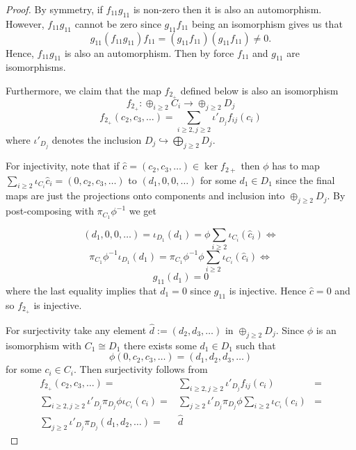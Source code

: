\begin{proof}
 By symmetry, if $f_{11}g_{11}$ is non-zero then it is also an automorphism. However, $f_{11}g_{11}$ cannot be zero since $g_{11}f_{11}$ being an isomorphism gives us that
 \[ g_{11}(f_{11}g_{11})f_{11} = (g_{11}f_{11})(g_{11}f_{11}) \neq 0.\]
 Hence, $f_{11}g_{11}$ is also an automorphism. Then by force $f_{11}$ and $g_{11}$ are isomorphisms.


  Furthermore, we claim that the map $f_{2_{+}}$ defined below is also an isomorphism
  \[ f_{2_{+}}: \oplus_{i \geq 2}C_{i} \to \oplus_{j \geq 2} D_{j} \]
  \[f_{2_{+}}(c_{2},c_{3},\dots) = \sum_{i \geq 2,j \geq 2} \iota'_{D_{j}}f_{ij}(c_{i}) \] where $\iota'_{D_{j}}$ denotes the inclusion $D_{j} \hookrightarrow \bigoplus_{j \geq 2} D_{j}$.

  For injectivity, note that if $\hat c = (c_{2},c_{3},\dots) \in \ker f_{2+}$ then $\phi$ has to map $\sum_{i \geq 2} \iota_{C_{i}} \hat c_{i}=(0,c_{2},c_{3},\dots)$ to $(d_{1},0,0,\dots)$ for some $d_{1} \in D_{1}$ since the final maps are just the projections onto components and inclusion into $\oplus_{j \geq 2}D_{j}$. By post-composing with $\pi_{C_{1}} \phi^{-1}$ we get

  \[(d_{1},0,0,\dots) = \iota_{D_{1}}(d_{1})= \phi \sum_{i \geq 2}\iota_{C_{i}}(\hat c_{i}) \iff
  \]
  \[
    \pi_{C_{1}} \phi^{-1} \iota_{D_{1}}(d_{1})=  \pi_{C_{1}} \phi^{-1} \phi \sum_{i \geq 2}\iota_{C_{i}}(\hat c_{i}) \iff \]
    \[  g_{11}(d_{1}) = 0
    \]
    where the last equality implies that $d_{1}=0$ since $g_{11}$ is injective. Hence $\hat c = 0$ and so $f_{2_{+}}$ is injective.

    For surjectivity take any element $\hat d := (d_{2},d_{3},\dots)$ in $\oplus_{j \geq 2}D_{j}$. Since $\phi$ is an isomorphism with $C_{1} \cong D_{1}$ there exists some $d_{1} \in D_{1}$ such that
    \[\phi (0,c_{2},c_{3},\dots) = (d_{1},d_{2},d_{3},\dots)\] for some $ c_{i} \in C_{i}$. Then surjectivity follows from
    \begin{align*}
       f_{2_{+}}(c_{2},c_{3}, \dots) = & \sum_{i \geq 2,j \geq 2} \iota'_{D_{j}}f_{ij}(c_{i}) &= \\
      \sum_{i \geq 2,j \geq 2} \iota'_{D_{j}}\pi_{D_{j}} \phi \iota_{C_{i}} (c_{i}) = &  \sum_{j \geq 2} \iota'_{D_{j}}\pi_{D_{j}} \phi \sum_{i \geq 2} \iota_{C_{i}} (c_{i})  &=\\
                                       \sum_{j \geq 2} \iota'_{D_{j}}\pi_{D_{j}} (d_{1},d_{2},\dots)   = & \hat d
    \end{align*}


\end{proof}
